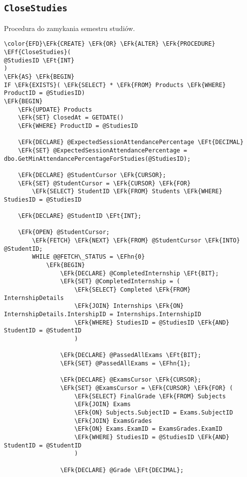 \documentclass[11pt]{article}
\newcommand{\EFk}[1]{\textcolor{EFk}{\textbf{#1}}} %
\newcommand{\EFf}[1]{\textcolor{EFf}{#1}} %
\newcommand{\EFt}[1]{\textcolor{EFt}{\textbf{#1}}} %
\newcommand{\EFhn}[1]{\textcolor{EFhn}{#1}} %
\begin{document}
\subsection{\texttt{CloseStudies}}
\label{sec:org462857a}
Procedura do zamykania semestru studiów.
\begin{Code}
\begin{Verbatim}
\color{EFD}\EFk{CREATE} \EFk{OR} \EFk{ALTER} \EFk{PROCEDURE} \EFf{CloseStudies}(
@StudiesID \EFt{INT}
)
\EFk{AS} \EFk{BEGIN}
IF \EFk{EXISTS}( \EFk{SELECT} * \EFk{FROM} Products \EFk{WHERE} ProductID = @StudiesID)
\EFk{BEGIN}
    \EFk{UPDATE} Products
    \EFk{SET} ClosedAt = GETDATE()
    \EFk{WHERE} ProductID = @StudiesID

    \EFk{DECLARE} @ExpectedSessionAttendancePercentage \EFt{DECIMAL}
    \EFk{SET} @ExpectedSessionAttendancePercentage = dbo.GetMinAttendancePercentageForStudies(@StudiesID);

    \EFk{DECLARE} @StudentCursor \EFk{CURSOR};
    \EFk{SET} @StudentCursor = \EFk{CURSOR} \EFk{FOR}
        \EFk{SELECT} StudentID \EFk{FROM} Students \EFk{WHERE} StudiesID = @StudiesID

    \EFk{DECLARE} @StudentID \EFt{INT};

    \EFk{OPEN} @StudentCursor;
        \EFk{FETCH} \EFk{NEXT} \EFk{FROM} @StudentCursor \EFk{INTO} @StudentID;
        WHILE @@FETCH\_STATUS = \EFhn{0}
            \EFk{BEGIN}
                \EFk{DECLARE} @CompletedInternship \EFt{BIT};
                \EFk{SET} @CompletedInternship = (
                    \EFk{SELECT} Completed \EFk{FROM} InternshipDetails
                    \EFk{JOIN} Internships \EFk{ON} InternshipDetails.IntershipID = Internships.InternshipID
                    \EFk{WHERE} StudiesID = @StudiesID \EFk{AND} StudentID = @StudentID
                    )

                \EFk{DECLARE} @PassedAllExams \EFt{BIT};
                \EFk{SET} @PassedAllExams = \EFhn{1};

                \EFk{DECLARE} @ExamsCursor \EFk{CURSOR};
                \EFk{SET} @ExamsCursor = \EFk{CURSOR} \EFk{FOR} (
                    \EFk{SELECT} FinalGrade \EFk{FROM} Subjects
                    \EFk{JOIN} Exams
                    \EFk{ON} Subjects.SubjectID = Exams.SubjectID
                    \EFk{JOIN} ExamsGrades
                    \EFk{ON} Exams.ExamID = ExamsGrades.ExamID
                    \EFk{WHERE} StudiesID = @StudiesID \EFk{AND} StudentID = @StudentID
                    )

                \EFk{DECLARE} @Grade \EFt{DECIMAL};


\end{Verbatim}
\end{Code}
\end{document}
